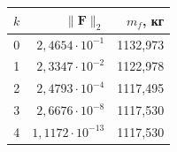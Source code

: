 \begin{tabular}{@{}rrr@{}}
\toprule
$k$ & $\|\mathbf F\|_2$ & $m_f$, кг \\
\midrule
0 & $2{,}4654\cdot10^{-1}$ & 1132{,}973 \\
1 & $2{,}3347\cdot10^{-2}$ & 1122{,}978 \\
2 & $2{,}4793\cdot10^{-4}$ & 1117{,}495 \\
3 & $2{,}6676\cdot10^{-8}$ & 1117{,}530 \\
4 & $1{,}1172\cdot10^{-13}$ & 1117{,}530 \\
\bottomrule
\end{tabular}
